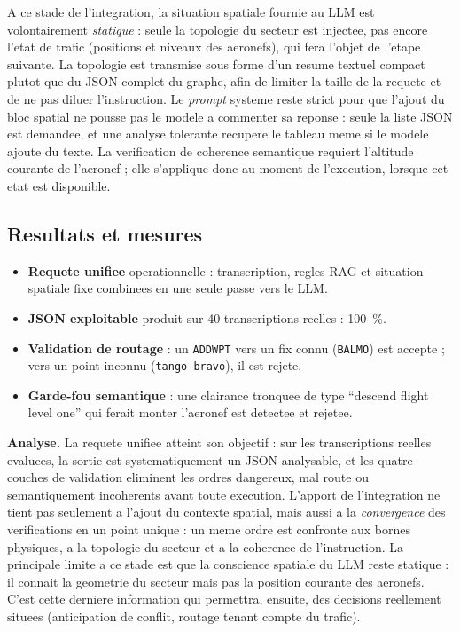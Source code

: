 \documentclass[11pt,a4paper]{article}
\begin{document}
\begin{warnbox}
A ce stade de l'integration, la situation spatiale fournie au LLM est volontairement
\emph{statique} : seule la topologie du secteur est injectee, pas encore l'etat de
trafic (positions et niveaux des aeronefs), qui fera l'objet de l'etape suivante. La
topologie est transmise sous forme d'un resume textuel compact plutot que du JSON
complet du graphe, afin de limiter la taille de la requete et de ne pas diluer
l'instruction. Le \emph{prompt} systeme reste strict pour que l'ajout du bloc spatial
ne pousse pas le modele a commenter sa reponse : seule la liste JSON est demandee, et
une analyse tolerante recupere le tableau meme si le modele ajoute du texte. La
verification de coherence semantique requiert l'altitude courante de l'aeronef ; elle
s'applique donc au moment de l'execution, lorsque cet etat est disponible.
\end{warnbox}

\subsection{Resultats et mesures}

\begin{resbox}
\begin{itemize}
  \item \textbf{Requete unifiee} operationnelle : transcription, regles RAG et
  situation spatiale fixe combinees en une seule passe vers le LLM.
  \item \textbf{JSON exploitable} produit sur 40 transcriptions reelles : 100~\%.
  \item \textbf{Validation de routage} : un \texttt{ADDWPT} vers un fix connu
  (\texttt{BALMO}) est accepte ; vers un point inconnu (\texttt{tango bravo}), il est
  rejete.
  \item \textbf{Garde-fou semantique} : une clairance tronquee de type ``descend
  flight level one'' qui ferait monter l'aeronef est detectee et rejetee.
\end{itemize}
\end{resbox}

\noindent\textbf{Analyse.} La requete unifiee atteint son objectif : sur les
transcriptions reelles evaluees, la sortie est systematiquement un JSON analysable, et
les quatre couches de validation eliminent les ordres dangereux, mal route ou
semantiquement incoherents avant toute execution. L'apport de l'integration ne tient
pas seulement a l'ajout du contexte spatial, mais aussi a la \emph{convergence} des
verifications en un point unique : un meme ordre est confronte aux bornes physiques,
a la topologie du secteur et a la coherence de l'instruction. La principale limite a
ce stade est que la conscience spatiale du LLM reste statique : il connait la
geometrie du secteur mais pas la position courante des aeronefs. C'est cette derniere
information qui permettra, ensuite, des decisions reellement situees (anticipation de
conflit, routage tenant compte du trafic).
\end{document}

